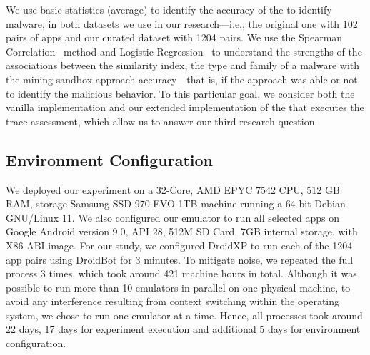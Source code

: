 We use basic statistics (average) to identify the
accuracy of the \mas to identify malware, in both
datasets we use in our research---i.e., the original
one with 102 pairs of apps and our curated dataset with
1204 pairs. We use the Spearman Correlation~\cite{spearman-correlation} method and
Logistic Regression~\cite{statistical-learning} to understand the strengths of
the associations between the similarity index, the type and family of a
malware with the mining sandbox approach accuracy---that is,
if the approach was able or not to identify the malicious behavior.
To this particular goal, we consider
both the vanilla implementation and our extended implementation
of the \mas that executes the trace assessment, which allow us
to answer our third research question. 


\subsection{Environment Configuration}\label{sec:hardware}


We deployed our experiment on a 32-Core, AMD EPYC 7542 CPU, 512 GB RAM, storage Samsung SSD 970 EVO 1TB machine running a 64-bit Debian  GNU/Linux 11. We also configured our emulator to run all selected apps on Google Android version 9.0, API 28, 512M SD Card, 7GB internal storage, with X86 ABI image.
For our study, we configured DroidXP to run each of the 1204 app pairs using DroidBot for 3 minutes. To mitigate noise, we repeated the full process 3 times,  which took around 421 machine hours in total. Although it was possible to run more than 10 emulators in parallel on one physical machine, to avoid any interference resulting from context switching within the operating system, we chose to run one emulator at a time.  Hence, all processes took around 22 days, 17 days for experiment execution and additional 5 days for environment configuration.

